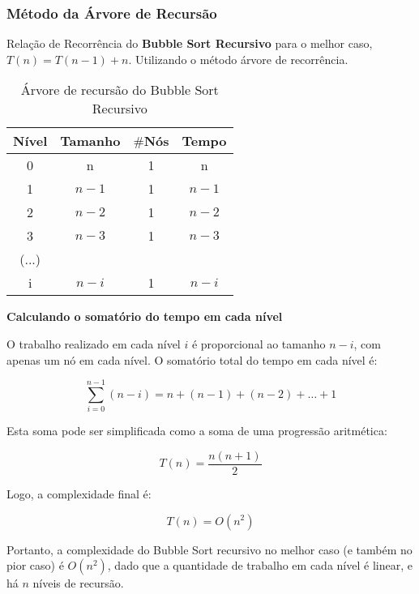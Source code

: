 \subsubsection{Método da Árvore de Recursão}

Relação de Recorrência do \textbf{Bubble Sort Recursivo} para o melhor caso, \( T(n) = T(n - 1) + n \). Utilizando o método árvore de recorrência.

\begin{table}[ht!]
    \centering
    \begin{tabular}{|c|c|c|c|}
    \hline
    \textbf{Nível} & \textbf{Tamanho} & $\#$\textbf{Nós} & \textbf{Tempo} \\ \hline
     0 & n & 1 & n \\ \hline
     1 & $n - 1$ & 1 & $n - 1$ \\ \hline
     2 & $n - 2$ & 1 & $n - 2$ \\ \hline
     3 & $n - 3$ & 1 & $n - 3$ \\ \hline
     (...) & & & \\ \hline
     i & $n - i$ & 1 & $n - i$ \\ \hline 
    \end{tabular}  
    \caption{Árvore de recursão do Bubble Sort Recursivo}
\end{table}

\textbf{Calculando o somatório do tempo em cada nível}

O trabalho realizado em cada nível \(i\) é proporcional ao tamanho \( n - i \), com apenas um nó em cada nível. O somatório total do tempo em cada nível é:

\[
\sum_{i=0}^{n-1} (n - i) = n + (n-1) + (n-2) + \dots + 1
\]

Esta soma pode ser simplificada como a soma de uma progressão aritmética:

\[
T(n) = \frac{n(n+1)}{2}
\]

Logo, a complexidade final é:

\[
T(n) = O(n^2)
\]

Portanto, a complexidade do Bubble Sort recursivo no melhor caso (e também no pior caso) é \( O(n^2) \), dado que a quantidade de trabalho em cada nível é linear, e há \( n \) níveis de recursão.
